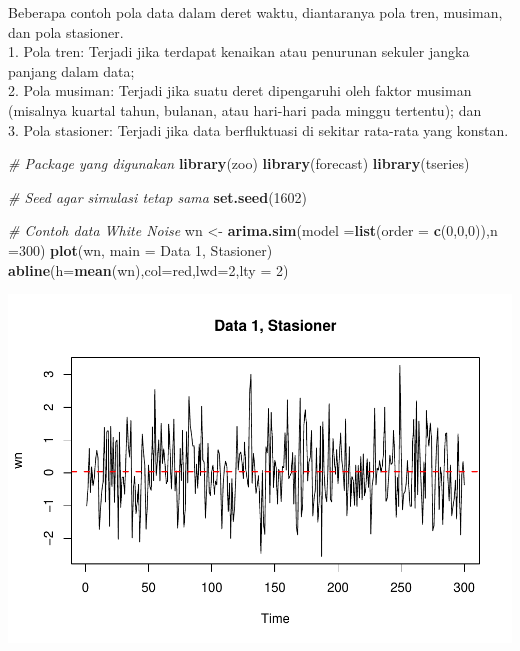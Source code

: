 \documentclass[
]{book}
\newenvironment{Shaded}{\begin{snugshade}}{\end{snugshade}}
\newcommand{\AttributeTok}[1]{\textcolor[rgb]{0.13,0.29,0.53}{#1}}
\newcommand{\CommentTok}[1]{\textcolor[rgb]{0.56,0.35,0.01}{\textit{#1}}}
\newcommand{\DecValTok}[1]{\textcolor[rgb]{0.00,0.00,0.81}{#1}}
\newcommand{\FunctionTok}[1]{\textcolor[rgb]{0.13,0.29,0.53}{\textbf{#1}}}
\newcommand{\NormalTok}[1]{#1}
\newcommand{\OtherTok}[1]{\textcolor[rgb]{0.56,0.35,0.01}{#1}}
\newcommand{\StringTok}[1]{\textcolor[rgb]{0.31,0.60,0.02}{#1}}
\begin{document}
Beberapa contoh pola data dalam deret waktu, diantaranya pola tren, musiman, dan pola stasioner.\\
1. Pola tren: Terjadi jika terdapat kenaikan atau penurunan sekuler jangka panjang dalam data;\\
2. Pola musiman: Terjadi jika suatu deret dipengaruhi oleh faktor musiman (misalnya kuartal tahun, bulanan, atau hari-hari pada minggu tertentu); dan\\
3. Pola stasioner: Terjadi jika data berfluktuasi di sekitar rata-rata yang konstan.

\begin{Shaded}
\begin{Highlighting}[]
\CommentTok{\# Package yang digunakan }
\FunctionTok{library}\NormalTok{(zoo)}
\FunctionTok{library}\NormalTok{(forecast)}
\FunctionTok{library}\NormalTok{(tseries)}

\CommentTok{\# Seed agar simulasi tetap sama}
\FunctionTok{set.seed}\NormalTok{(}\DecValTok{1602}\NormalTok{)}

\CommentTok{\# Contoh data White Noise}
\NormalTok{wn }\OtherTok{\textless{}{-}} \FunctionTok{arima.sim}\NormalTok{(}\AttributeTok{model =}\FunctionTok{list}\NormalTok{(}\AttributeTok{order =} \FunctionTok{c}\NormalTok{(}\DecValTok{0}\NormalTok{,}\DecValTok{0}\NormalTok{,}\DecValTok{0}\NormalTok{)),}\AttributeTok{n =}\DecValTok{300}\NormalTok{)}
\FunctionTok{plot}\NormalTok{(wn, }\AttributeTok{main =} \StringTok{\textquotesingle{}Data 1, Stasioner\textquotesingle{}}\NormalTok{)}
\FunctionTok{abline}\NormalTok{(}\AttributeTok{h=}\FunctionTok{mean}\NormalTok{(wn),}\AttributeTok{col=}\StringTok{\textquotesingle{}red\textquotesingle{}}\NormalTok{,}\AttributeTok{lwd=}\DecValTok{2}\NormalTok{,}\AttributeTok{lty =} \DecValTok{2}\NormalTok{)}
\end{Highlighting}
\end{Shaded}

\begin{center}\includegraphics{_main_files/figure-latex/Contoh Plot yang Stasioner dan Tidak Stasioner-1} \end{center}
\end{document}
